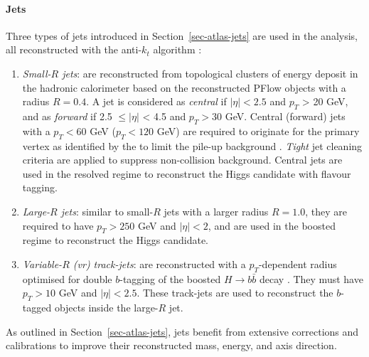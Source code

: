 \paragraph{Jets} Three types of jets introduced in Section~\ref{sec-atlas-jets} are used in the analysis, all reconstructed with the anti-$k_t$ algorithm \cite{Cacciari:2008gp}:
\begin{enumerate}
  \item \textit{Small-$R$ jets}: are reconstructed from topological clusters of energy deposit in the hadronic calorimeter based on the reconstructed PFlow objects with a radius $R = 0.4$. A jet is considered as \textit{central} if $|\eta| < 2.5$ and $p_T$ > 20 GeV, and as \textit{forward} if 2.5 $\leq |\eta|$ < 4.5 and $p_T > 30$ GeV. Central (forward) jets with a $p_T < 60$ GeV ($p_T < 120$ GeV) are required to originate for the primary vertex as identified by the  to limit the pile-up background \cite{atlasPUJVT}. \textit{Tight} jet cleaning criteria are applied to suppress non-collision background. Central jets are used in the resolved regime to reconstruct the Higgs candidate with flavour tagging. 
  \item \textit{Large-$R$ jets}: similar to small-$R$ jets with a larger radius $R = 1.0$, they are required to have $p_T > 250$ GeV and $|\eta| < 2$, and are used in the boosted regime to reconstruct the Higgs candidate. 
  \item \textit{Variable-$R$ (\gls{vr}) track-jets}: are reconstructed with a $p_T$-dependent radius optimised for double $b$-tagging of the boosted $H \rightarrow b\bar{b}$ decay \cite{ATL-PHYS-PUB-2017-010}. They must have $p_T > 10$ GeV and $|\eta| < 2.5$. These track-jets are used to reconstruct the $b$-tagged objects inside the large-$R$ jet. 
\end{enumerate}
As outlined in Section~\ref{sec-atlas-jets}, jets benefit from extensive corrections and calibrations to improve their reconstructed mass, energy, and axis direction.

